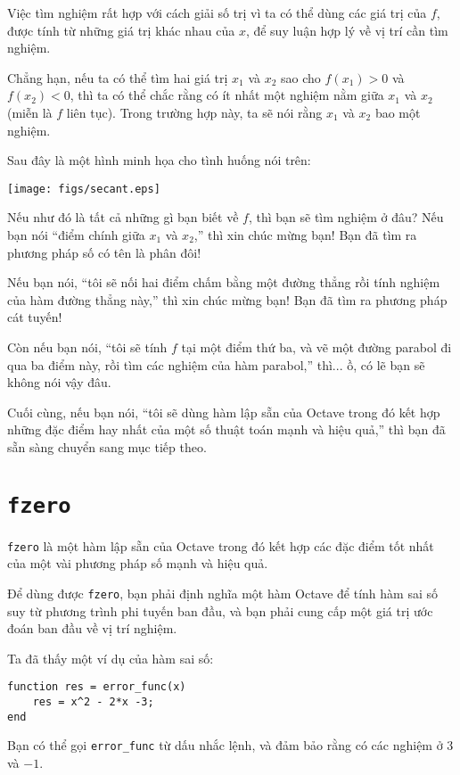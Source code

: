 \documentclass[12pt]{book}
\begin{document}
Việc tìm nghiệm rất hợp với cách giải số trị vì ta có thể dùng
các giá trị của $f$, được tính từ những giá trị khác nhau của $x$, 
để suy luận hợp lý về vị trí cần tìm nghiệm.

Chẳng hạn, nếu ta có thể tìm hai giá trị $x_1$ và $x_2$ sao cho
$f(x_1) > 0$ và $f(x_2) < 0$, thì ta có thể chắc rằng có ít nhất một
nghiệm nằm giữa $x_1$ và $x_2$ (miễn là $f$ liên tục). Trong trường
hợp này, ta sẽ nói rằng $x_1$ và $x_2$ bao một nghiệm.

Sau đây là một hình minh họa cho tình huống nói trên:

\centerline{\texttt{[image: figs/secant.eps]}}

Nếu như đó là tất cả những gì bạn biết về $f$, thì bạn sẽ tìm
nghiệm ở đâu? Nếu bạn nói ``điểm chính giữa $x_1$ và $x_2$,''
thì xin chúc mừng bạn! Bạn đã tìm ra phương pháp số có tên là
phân đôi!

Nếu bạn nói, ``tôi sẽ nối hai điểm chấm bằng một đường thẳng rồi
tính nghiệm của hàm đường thẳng này,'' thì xin chúc mừng bạn! Bạn đã
tìm ra phương pháp cát tuyến!

Còn nếu bạn nói, ``tôi sẽ tính $f$ tại một điểm thứ ba, và vẽ một
đường parabol đi qua ba điểm này, rồi tìm các nghiệm của hàm
parabol,'' thì... ồ, có lẽ bạn sẽ không nói vậy đâu.

Cuối cùng, nếu bạn nói, ``tôi sẽ dùng hàm lập sẵn của Octave trong đó
kết hợp những đặc điểm hay nhất của một số thuật toán mạnh và
hiệu quả,'' thì bạn đã sẵn sàng chuyển sang mục tiếp theo.


\section{{\tt fzero}}
\label{fzero}

{\tt fzero} là một hàm lập sẵn của Octave trong đó kết hợp các
đặc điểm tốt nhất của một vài phương pháp số mạnh và hiệu quả.

Để dùng được {\tt fzero}, bạn phải định nghĩa một hàm Octave 
để tính hàm sai số suy từ phương trình phi tuyến ban đầu, và bạn
phải cung cấp một giá trị ước đoán ban đầu về vị trí nghiệm.

Ta đã thấy một ví dụ của hàm sai số:

\begin{verbatim}
function res = error_func(x)
    res = x^2 - 2*x -3;
end
\end{verbatim}
%
Bạn có thể gọi \verb#error_func# từ dấu nhắc lệnh, và
đảm bảo rằng có các nghiệm ở 3 và $-1$.
\end{document}
